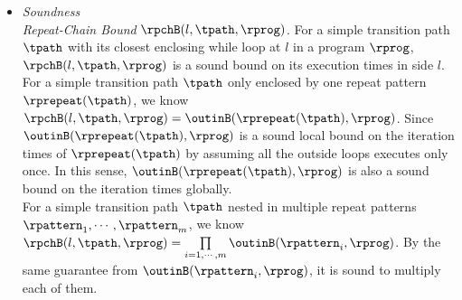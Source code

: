   \begin{itemize}
  \item 
  \emph{Soundness}
  \\
  \emph{Repeat-Chain Bound}  $\rpchB(l, \tpath, \rprog)$.
  For a simple transition path $\tpath$ with its closest enclosing while loop at $l$ in a program $\rprog$, $\rpchB(l, \tpath, \rprog)$
  is a sound bound on its execution times in side $l$.
  \\
  For a simple transition path $\tpath$ only enclosed by one repeat pattern $\rprepeat(\tpath)$, 
  we know $\rpchB(l, \tpath, \rprog) = \outinB(\rprepeat(\tpath), \rprog)$.
  Since $\outinB(\rprepeat(\tpath), \rprog)$ is a sound local bound on the iteration times
  of $\rprepeat(\tpath)$ by assuming all the outside loops executes only once.
  In this sense, $\outinB(\rprepeat(\tpath), \rprog)$ is also a sound bound on the iteration times globally.
  \\
  For a simple transition path $\tpath$ nested in multiple repeat patterns $\rpattern_1, \cdots, \rpattern_m$,
  we know $\rpchB(l, \tpath, \rprog) = \prod\limits_{i = 1, \cdots, m}\outinB(\rpattern_i, \rprog)$.
  By the same guarantee from $\outinB(\rpattern_i, \rprog)$, it is sound to multiply each of them.
  

\end{itemize}
